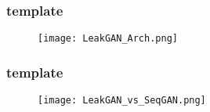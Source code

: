 \documentclass{beamer}
\begin{document}
\begin{frame}
\frametitle{template}
\begin{figure}[ht]
  \texttt{[image: LeakGAN\_Arch.png]}
\end{figure}
\end{frame}

\begin{frame}
\frametitle{template}
\begin{figure}[ht]
  \texttt{[image: LeakGAN\_vs\_SeqGAN.png]}
\end{figure}
\end{frame}

% 
% 
% 
% 
% 
% 
% 
\end{document}
